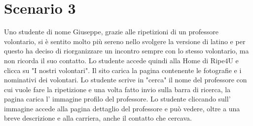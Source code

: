    \section{Scenario 3}
    Uno studente di nome Giuseppe, grazie alle ripetizioni di un professore
    volontario, si è sentito molto più sereno nello svolgere la versione di
    latino e per questo ha deciso di riorganizzare un incontro sempre con lo
    stesso volontario, ma non ricorda il suo contatto. Lo studente accede quindi
    alla Home di Ripe4U e clicca su "I nostri volontari". Il sito carica la
    pagina contenente le fotografie e i nominativi dei volontari. Lo studente
    scrive in "cerca" il nome del professore con cui vuole fare la ripetizione e
    una volta fatto invio sulla barra di ricerca, la pagina carica l'
    immagine profilo del professore. Lo studente cliccando sull' immagine
    accede alla pagina dettaglio del professore e può vedere, oltre a una breve
    descrizione e alla carriera, anche il contatto che cercava.
 